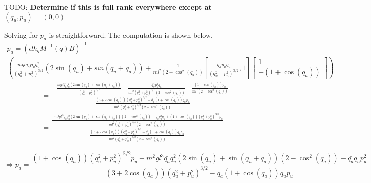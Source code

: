TODO: \textbf{Determine if this is full rank everywhere except at \((q_u,p_u) = (0,0)\)}

Solving for \(p_a\) is straightforward. The computation is shown below.
\begin{multline*}
    p_a = \left(dh_q M^{-1}(q)B\right)^{-1}  \\
        \left(\frac{m g l \bar{q_a}p_u q_u^2}{(q_u^2+p_u^2)^{3/2}} 
            \left(2\sin(q_u) + sin(q_u + q_a) \right)
        +
            \frac{1}{m l^2 (2 - \cos^2(q_a))}
            [ \frac{\bar{q_a}p_uq_u}{(q_u^2+p_u^2)^{3/2}}, 1] 
            \begin{bmatrix}
              1 \\
              -(1 + \cos(q_a))
          \end{bmatrix} \right)
\end{multline*}
\begin{align*}
    &= -\frac
    {
        \frac{ m g l \bar{q_a}q_u^2(2\sin(q_u) + \sin(q_u+q_a))}{(q_u^2+p_u^2)^{3/2}}
        + \frac{\bar{q_a} p_u^2 q_u}{m l^2 (q_u^2 + p_u^2)^{3/2} (2 -\cos^2(q_a))}
        - \frac{(1+\cos(q_a)) p_u}{m l^2 (2 - \cos^2(q_a))}
    }
    {
        \frac
        {
            (3 + 2\cos(q_a))(q_u^2+p_u^2)^{3/2} - \bar{q_a}(1 + \cos(q_a))q_up_u
        }
        {
            m l^2 (q_u^2+p_u^2)^{3/2} (2 - \cos^2(q_a))
        }
    } \\
    &= \frac
    {
        \frac
        {
            -m^2 g l^3 \bar{q_a}q_u^2(2\sin(q_u) + \sin(q_u+q_a))(2 - \cos^2(q_a))
            - \bar{q_a}p_u^2 q_u 
            + (1 + \cos(q_a))(q_u^2 + p_u^2)^{3/2} p_u
        }
        {
            m l^2 (q_u^2+p_u^2)^{3/2} (2 - \cos^2(q_a))
        }
    }
    {
        \frac
        {
            (3 + 2\cos(q_a))(q_u^2+p_u^2)^{3/2} - \bar{q_a}(1 + \cos(q_a))q_up_u
        }
        {
            m l^2 (q_u^2+p_u^2)^{3/2} (2 - \cos^2(q_a))
        }
    }
\end{align*}

\begin{equation*}
    \Rightarrow p_a = \frac
        {
            (1 + \cos(q_a))(q_u^2 + p_u^2)^{3/2} p_u
            -m^2 g l^3 \bar{q_a}q_u^2(2\sin(q_u) + \sin(q_u+q_a))(2 - \cos^2(q_a))
            - \bar{q_a}q_up_u^2
        }
        {
            (3 + 2\cos(q_a))(q_u^2+p_u^2)^{3/2} - \bar{q_a}(1 + \cos(q_a))q_up_u
        }
\end{equation*}

